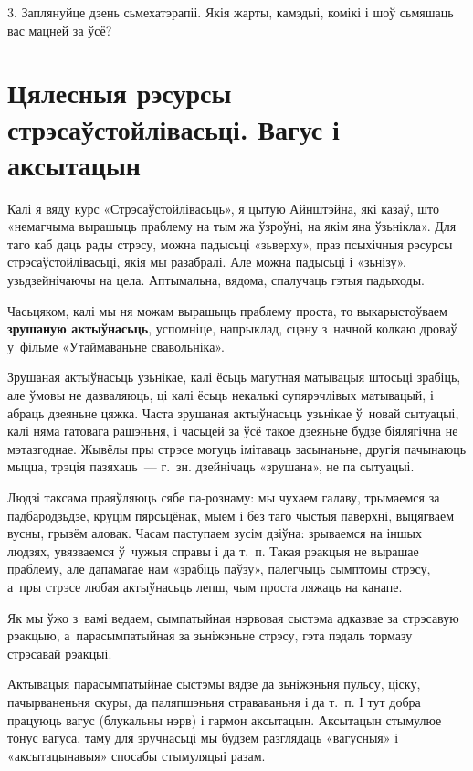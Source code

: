 3. Заплянуйце дзень сьмехатэрапіі. Якія жарты, камэдыі, комікі і шоў сьмяшаць вас мацней за ўсё?


\section{Цялесныя рэсурсы стрэсаўстойлівасьці. Вагус і аксытацын}

Калі я вяду курс «Стрэсаўстойлівасьць», я цытую Айнштэйна, які казаў, што «немагчыма вырашыць праблему на тым жа ўзроўні, на якім яна ўзьнікла». Для таго каб даць рады стрэсу, можна падысьці «зьверху», праз псыхічныя рэсурсы стрэсаўстойлівасьці, якія мы разабралі. Але можна падысьці і «зьнізу», узьдзейнічаючы на цела. Аптымальна, вядома, спалучаць гэтыя падыходы.

Часьцяком, калі мы ня можам вырашыць праблему проста, то выкарыстоўваем \textbf{зрушаную актыўнасьць}, успомніце, напрыклад, сцэну з~начной колкаю дроваў у~фільме «Утаймаваньне свавольніка».

Зрушаная актыўнасьць узьнікае, калі ёсьць магутная матывацыя штосьці зрабіць, але ўмовы не дазваляюць, ці калі ёсьць некалькі супярэчлівых матывацый, і абраць дзеяньне цяжка. Часта зрушаная актыўнасьць узьнікае ў~новай сытуацыі, калі няма гатовага рашэньня, і часьцей за ўсё такое дзеяньне будзе біялягічна не мэтазгоднае. Жывёлы пры стрэсе могуць імітаваць засынаньне, другія пачынаюць мыцца, трэція пазяхаць~--- г.~зн. дзейнічаць «зрушана», не па сытуацыі.

Людзі таксама праяўляюць сябе па-рознаму: мы чухаем галаву, трымаемся за падбародзьдзе, круцім пярсьцёнак, мыем і без таго чыстыя паверхні, выцягваем вусны, грызём аловак. Часам паступаем зусім дзіўна: зрываемся на іншых людзях, увязваемся ў~чужыя справы і да т.~п. Такая рэакцыя не вырашае праблему, але дапамагае нам «зрабіць паўзу», палегчыць сымптомы стрэсу, а~пры стрэсе любая актыўнасьць лепш, чым проста ляжаць на канапе. 


Як мы ўжо з~вамі ведаем, сымпатыйная нэрвовая сыстэма адказвае за стрэсавую рэакцыю, а~парасымпатыйная за зьніжэньне стрэсу, гэта пэдаль тормазу стрэсавай рэакцыі. 

Актывацыя парасымпатыйнае сыстэмы вядзе да зьніжэньня пульсу, ціску, пачырваненьня скуры, да паляпшэньня страваваньня і да т.~п. І тут добра працуюць вагус (блукальны нэрв) і гармон аксытацын. Аксытацын стымулюе тонус вагуса, таму для зручнасьці мы будзем разглядаць «вагусныя» і «аксытацынавыя» спосабы стымуляцыі разам.

